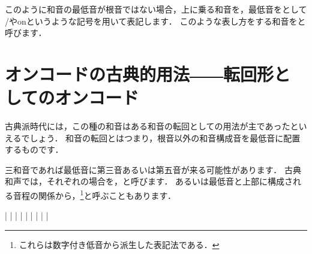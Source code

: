 \documentclass[dvipdfmx,uplatex,b5paper,openany,jbase=12Q,nomag*,textwidth-limit=44%
               ]{gachimuchi}
\begin{document}
このように和音の最低音が根音ではない場合，上に乗る和音を\txCirc ，最低音を\txSqr として
\txCirc/\txSqr や\txCirc on\txSqr というような記号を用いて表記します．
このような表し方をする和音をと呼びます．

\section{オンコードの古典的用法――転回形としてのオンコード}
古典派時代には，この種の和音はある和音の転回としての用法が主であったといえるでしょう．
和音の転回とはつまり，根音以外の和音構成音を最低音に配置するものです．

三和音であれば最低音に第三音あるいは第五音が来る可能性があります．
古典和声では，それぞれの場合を，と呼びます．
あるいは最低音と上部に構成される音程の関係から，\footnote{%
  これらは数字付き低音から派生した表記法である．
}と呼ぶこともあります．

\begin{Music}[0.5\linewidth]
  \Startpiece
  \znotes|\en%
  \NOTes%
  |%
  \en%
  \NOTes|\sk\en%
  \NOTes|\sk\en%
  \bar%
  \znotes|\en%
  \NOTes%
  |%
  \en%
  \NOTes|\sk\en%
  \NOTes|\sk\en%
  \endpiece
\end{Music}
\end{document}
